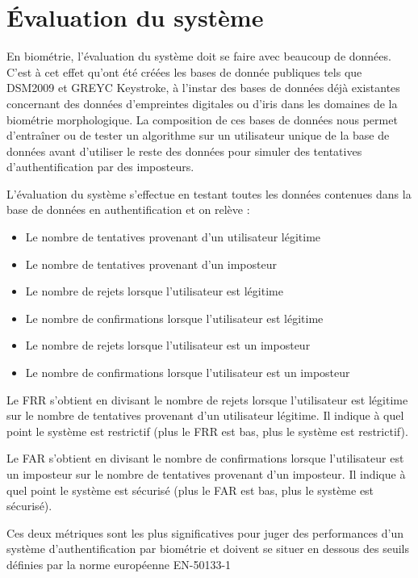 \section{Évaluation du système}

En biométrie, l'évaluation du système doit se faire avec beaucoup de données. C'est à cet effet qu'ont été créées les bases de donnée publiques tels que DSM2009\cite{killourhy2009} et GREYC Keystroke\cite{giotGREYC}, à l'instar des bases de données déjà existantes concernant des données d'empreintes digitales ou d'iris dans les domaines de la biométrie morphologique. La composition de ces bases de données nous permet d'entraîner ou de tester un algorithme sur un utilisateur unique de la base de données avant d'utiliser le reste des données pour simuler des tentatives d'authentification par des imposteurs.

L'évaluation du système s'effectue en testant toutes les données contenues dans la base de données en authentification et on relève :

\begin{itemize}
  \item Le nombre de tentatives provenant d'un utilisateur légitime
  \item Le nombre de tentatives provenant d'un imposteur
  \item Le nombre de rejets lorsque l'utilisateur est légitime
  \item Le nombre de confirmations lorsque l'utilisateur est légitime
  \item Le nombre de rejets lorsque l'utilisateur est un imposteur
  \item Le nombre de confirmations lorsque l'utilisateur est un imposteur
\end{itemize}

Le FRR s'obtient en divisant le nombre de rejets lorsque l'utilisateur est légitime sur le nombre de tentatives provenant d'un utilisateur légitime. Il indique à quel point le système est restrictif (plus le FRR est bas, plus le système est restrictif).

Le FAR s'obtient en divisant le nombre de confirmations lorsque l'utilisateur est un imposteur sur le nombre de tentatives provenant d'un imposteur. Il indique à quel point le système est sécurisé (plus le FAR est bas, plus le système est sécurisé).

Ces deux métriques sont les plus significatives pour juger des performances d'un système d'authentification par biométrie et doivent se situer en dessous des seuils définies par la norme européenne EN-50133-1
